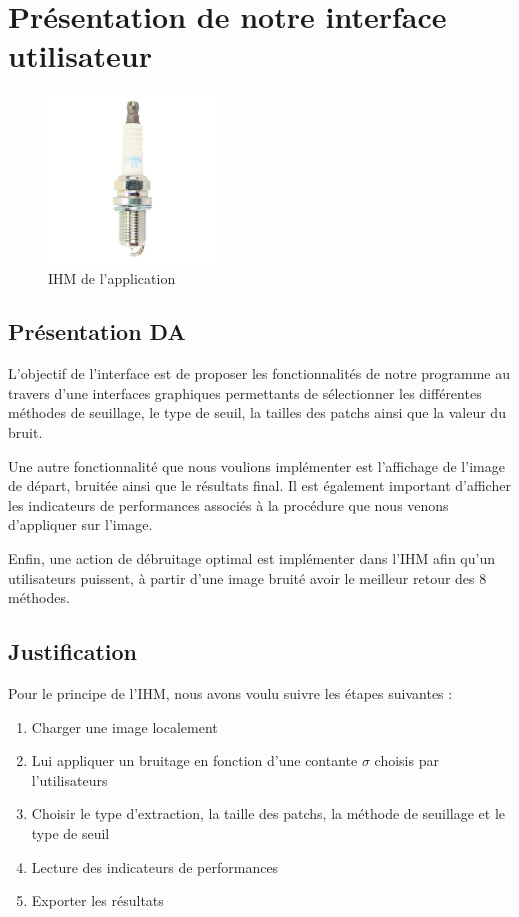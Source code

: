\section{Présentation de notre interface utilisateur}
\begin{figure}[hbt!]
    \centering
    \includegraphics[width=0.4\textwidth]{reference/picture/bougie.jpg}
    \caption{IHM de l'application}
\end{figure}
\subsection{Présentation DA}
L'objectif de l'interface est de proposer les fonctionnalités de notre programme au travers d'une interfaces graphiques permettants de sélectionner les différentes méthodes de seuillage, le type de seuil, la tailles des patchs ainsi que la valeur du bruit. \par
Une autre fonctionnalité que nous voulions implémenter est l'affichage de l'image de départ, bruitée ainsi que le résultats final. Il est également important d'afficher les indicateurs de performances associés à la procédure que nous venons d'appliquer sur l'image. \par
Enfin, une action de débruitage optimal est implémenter dans l'IHM afin qu'un utilisateurs puissent, à partir d'une image bruité avoir le meilleur retour des 8 méthodes.
\subsection{Justification}
Pour le principe de l'IHM, nous avons voulu suivre les étapes suivantes :
\begin{enumerate}
    \item Charger une image localement
    \item Lui appliquer un bruitage en fonction d'une contante \(\sigma\) choisis par l'utilisateurs
    \item Choisir le type d'extraction, la taille des patchs, la méthode de seuillage et le type de seuil
    \item Lecture des indicateurs de performances
    \item Exporter les résultats
\end{enumerate}

